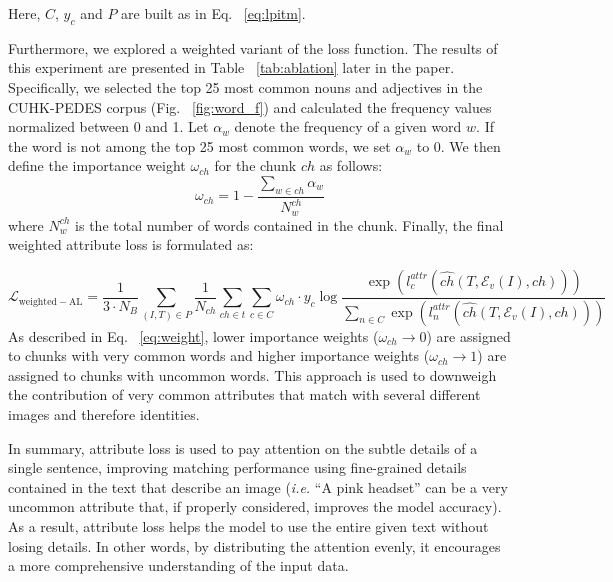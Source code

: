 \documentclass[acmsmall]{acmart}
\begin{document}
\noindent
Here, $C$, \( y_c \) and $P$ are built as in Eq. ~\ref{eq:lpitm}. 

Furthermore, we explored a weighted variant of the loss function. The results of this experiment are presented in Table ~\ref{tab:ablation} later in the paper. Specifically, we selected the top 25 most common nouns and adjectives in the CUHK-PEDES corpus (Fig. ~\ref{fig:word_f}) and calculated the frequency values normalized between 0 and 1. Let $\alpha_w$ denote the frequency of a given word $w$. If the word is not among the top 25 most common words, we set $\alpha_w$ to 0. We then define the importance weight $\omega_{ch}$ for the chunk $ch$ as follows:
\begin{equation}
    \omega_{ch}=1-\frac{\sum_{w\in ch}\alpha_w}{N^{ch}_w}
    \label{eq:weight}
\end{equation}
where $N^{ch}_w$ is the total number of words contained in the chunk. Finally, the final weighted attribute loss is formulated as:

\begin{equation}
    \mathcal{L}_\mathrm{weighted-AL}=\frac{1}{3\cdot N_B}\sum_{(I,T)\in P}\frac{1}{N_{ch}}\sum_{ch\in t}\sum_{c\in C}\omega_{ch}\cdot y_c\log\frac{\exp(l^{attr}_c(\hat{ch}(T,\mathcal{E}_{v}(I),ch)))}{\sum_{n\in C}\exp(l^{attr}_n(\hat{ch}(T,\mathcal{E}_{v}(I),ch)))}
\end{equation}
\noindent
As described in Eq. ~\ref{eq:weight}, lower importance weights ($\omega_{ch} \rightarrow 0$) are assigned to chunks with very common words and higher importance weights  ($\omega_{ch} \rightarrow 1$) are assigned to chunks with uncommon words. This approach is used to downweigh the contribution of very common attributes that match with several different images and therefore identities.

In summary, attribute loss is used to pay attention on the subtle details of a single sentence, improving matching performance using fine-grained details contained in the text that describe an image (\textit{i.e.} ``A pink headset'' can be a very uncommon attribute that, if properly considered, improves the model accuracy). As a result, attribute loss helps the model to use the entire given text without losing details. In other words, by distributing the attention evenly, it encourages a more comprehensive understanding of the input data.
\end{document}
